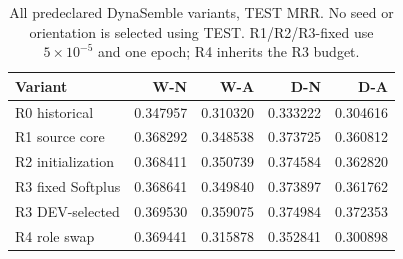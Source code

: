 \begin{table}[htbp]
\centering\small
\setlength{\tabcolsep}{4pt}
\caption{All predeclared DynaSemble variants, TEST MRR. No seed or orientation is selected using TEST. R1/R2/R3-fixed use $5\times10^{-5}$ and one epoch; R4 inherits the R3 budget.}
\label{tab:dyna-variants}
\begin{tabular}{lrrrr}
\toprule
Variant & W-N & W-A & D-N & D-A\\
\midrule
R0 historical & 0.347957 & 0.310320 & 0.333222 & 0.304616\\
R1 source core & 0.368292 & 0.348538 & 0.373725 & 0.360812\\
R2 initialization & 0.368411 & 0.350739 & 0.374584 & 0.362820\\
R3 fixed Softplus & 0.368641 & 0.349840 & 0.373897 & 0.361762\\
R3 DEV-selected & 0.369530 & 0.359075 & 0.374984 & 0.372353\\
R4 role swap & 0.369441 & 0.315878 & 0.352841 & 0.300898\\
\bottomrule
\end{tabular}
\end{table}
